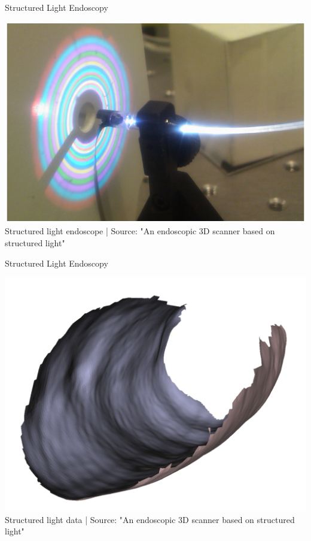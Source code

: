 \begin{frame}{Structured Light Endoscopy}

	\begin{center}
		\includegraphics[height=.8\textheight ]{images/structuredLight}\\
		\scriptsize Structured light endoscope | Source: "An endoscopic 3D scanner based on structured light"
	\end{center}

\end{frame}



\begin{frame}{Structured Light Endoscopy}

	\begin{center}
		\includegraphics[height=.8\textheight ]{images/structuredLight1}\\
		\scriptsize Structured light data | Source: "An endoscopic 3D scanner based on structured light"
	\end{center}

\end{frame}



